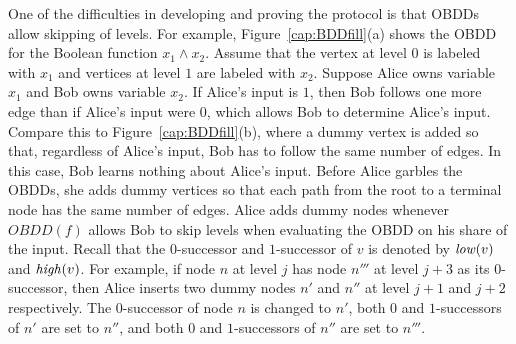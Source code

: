 One of the difficulties in developing and proving the protocol is
that OBDDs allow skipping of levels.  For example,
Figure~\ref{cap:BDDfill}(a) shows the OBDD for the Boolean function
$x_1 \wedge x_2$. Assume that the vertex at level $0$ is labeled with
$x_1$ and vertices at level $1$ are labeled with $x_2$. Suppose Alice
owns variable $x_1$ and Bob owns variable $x_2$. If Alice's input
is $1$, then Bob follows one more edge than if Alice's input were
$0$, which allows Bob to determine Alice's input. Compare this to
Figure~\ref{cap:BDDfill}(b), where a dummy vertex is added so
that, regardless of Alice's input, Bob has to follow the same number of
edges. In this case, Bob learns nothing about Alice's input. Before
Alice garbles the OBDDs, she adds dummy vertices so that each path
from the root to a terminal node has the same number of edges.  Alice adds
dummy nodes whenever $OBDD(f)$ allows Bob to skip levels when
evaluating the OBDD on his share of the input. Recall that the
$0$-successor and $1$-successor of $v$ is denoted by ${\it low}(v)$
and ${\it high}(v)$. For example, if node $n$ at level $j$ has node $n'''$ at level
$j+3$ as its $0$-successor, then Alice inserts two dummy nodes $n'$
and $n''$ at level $j+1$ and $j+2$ respectively. The $0$-successor of
node $n$ is changed to $n'$, both $0$ and $1$-successors of $n'$ are
set to $n''$, and both $0$ and $1$-successors of $n''$ are set to
$n'''$.


